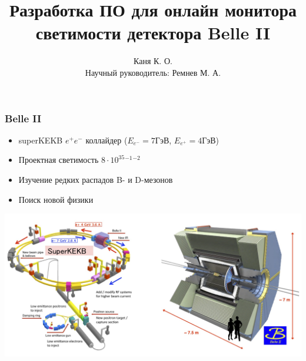 \documentclass{beamer}
\title{Разработка ПО для онлайн монитора светимости детектора Belle II}
\author{Каня К. О. \\
        Научный руководитель: Ремнев М. А.}
\institute{Новосибирский Государственный Университет}
\begin{document}
\begin{frame}
\titlepage
\end{frame}

\begin{frame}
\frametitle{Belle II}
    \begin{itemize}
        \item superKEKB $e^+e^-$ коллайдер ($E_{e^-}=7$ГэВ, $E_{e^+}=4$ГэВ)
        \item Проектная светимость $8\cdot10^{35}$$^{-1}$$^{-2}$
        \item Изучение редких распадов B- и D-мезонов
        \item Поиск новой физики
    \end{itemize}
    \includegraphics[width=\textwidth]{SuperKEKB_BelleII.jpg}
\end{frame}
\end{document}
